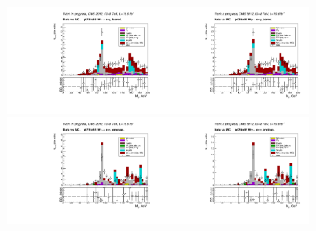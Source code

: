 \begin{figure}[htb]
  \begin{center}
    \includegraphics[width=0.40\textwidth]{../figs/figs_v11/ELECTRON_WGamma/PrepareYields/c_TotalDATAvsMC_Barrel__Mpholep1PRELIMINARY_FOR_E_TO_GAMMA_WITH_PSV_CUT_pt75to85_.pdf}\includegraphics[width=0.40\textwidth]{../figs/figs_v11/ELECTRON_WGamma/PrepareYields/c_TotalDATAvsMC_Barrel__Mpholep1PRELIMINARY_FOR_E_TO_GAMMA_WITH_PSV_CUT_pt75to85__etogScale.pdf}\\
    \includegraphics[width=0.40\textwidth]{../figs/figs_v11/ELECTRON_WGamma/PrepareYields/c_TotalDATAvsMC_Endcap__Mpholep1PRELIMINARY_FOR_E_TO_GAMMA_WITH_PSV_CUT_pt75to85_.pdf}\includegraphics[width=0.40\textwidth]{../figs/figs_v11/ELECTRON_WGamma/PrepareYields/c_TotalDATAvsMC_Endcap__Mpholep1PRELIMINARY_FOR_E_TO_GAMMA_WITH_PSV_CUT_pt75to85__etogScale.pdf}\\

\end{center}
\end{figure}
